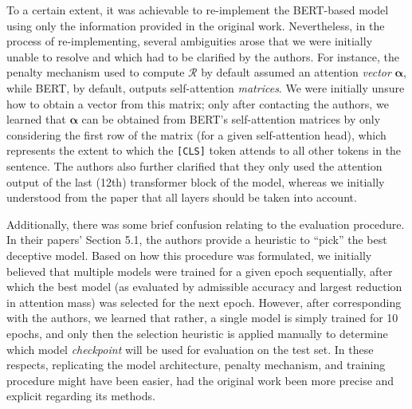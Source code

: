 To a certain extent, it was achievable to re-implement the BERT-based model using only the information provided in the original work. Nevertheless, in the process of re-implementing, several ambiguities arose that we were initially unable to resolve and which had to be clarified by the authors. For instance, the penalty mechanism used to compute $\mathcal{R}$ by default assumed an attention \textit{vector} $\boldsymbol{\alpha}$, while BERT, by default, outputs self-attention \textit{matrices}. We were initially unsure how to obtain a vector from this matrix; only after contacting the authors, we learned that $\boldsymbol{\alpha}$ can be obtained from BERT's self-attention matrices by only considering the first row of the matrix (for a given self-attention head), which represents the extent to which the \texttt{[CLS]} token attends to all other tokens in the sentence. The authors also further clarified that they only used the attention output of the last (12th) transformer block of the model, whereas we initially understood from the paper that all layers should be taken into account.

Additionally, there was some brief confusion relating to the evaluation procedure. In their papers' Section 5.1, the authors provide a heuristic to ``pick'' the best deceptive model. Based on how this procedure was formulated, we initially believed that multiple models were trained for a given epoch sequentially, after which the best model (as evaluated by admissible accuracy and largest reduction in attention mass) was selected for the next epoch. However, after corresponding with the authors, we learned that rather, a single model is simply trained for 10 epochs, and only then the selection heuristic is applied manually to determine which model \textit{checkpoint} will be used for evaluation on the test set. In these respects, replicating the model architecture, penalty mechanism, and training procedure might have been easier, had the original work been more precise and explicit regarding its methods.

